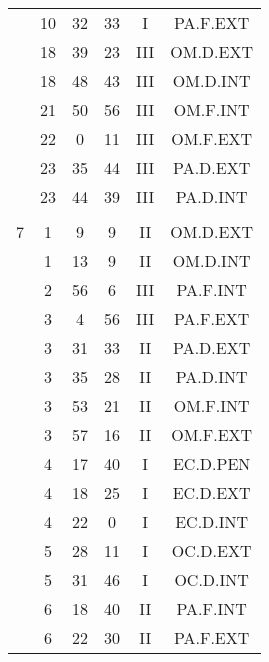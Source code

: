 \documentclass[12pt, a4paper]{article}
\begin{document}
\begin{multicols}{3}
{\begin{tabular}{c c c c c c}
	 	 	 	 & 10 & 32 & 33 & I & PA.F.EXT\\%
	 	 	 	 & 18 & 39 & 23 & III & OM.D.EXT\\%
	 	 	 	 & 18 & 48 & 43 & III & OM.D.INT\\%
	 	 	 	 & 21 & 50 & 56 & III & OM.F.INT\\%
	 	 	 	 & 22 & 0 & 11 & III & OM.F.EXT\\%
	 	 	 	 & 23 & 35 & 44 & III & PA.D.EXT\\%
	 	 	 	 & 23 & 44 & 39 & III & PA.D.INT\\%
	 	 	 	 & & & & & \\%
	 	 	 	7 & 1 & 9 & 9 & II & OM.D.EXT\\%
	 	 	 	 & 1 & 13 & 9 & II & OM.D.INT\\%
	 	 	 	 & 2 & 56 & 6 & III & PA.F.INT\\%
	 	 	 	 & 3 & 4 & 56 & III & PA.F.EXT\\%
	 	 	 	 & 3 & 31 & 33 & II & PA.D.EXT\\%
	 	 	 	 & 3 & 35 & 28 & II & PA.D.INT\\%
	 	 	 	 & 3 & 53 & 21 & II & OM.F.INT\\%
	 	 	 	 & 3 & 57 & 16 & II & OM.F.EXT\\%
	 	 	 	 & 4 & 17 & 40 & I & EC.D.PEN\\%
	 	 	 	 & 4 & 18 & 25 & I & EC.D.EXT\\%
	 	 	 	 & 4 & 22 & 0 & I & EC.D.INT\\%
	 	 	 	 & 5 & 28 & 11 & I & OC.D.EXT\\%
	 	 	 	 & 5 & 31 & 46 & I & OC.D.INT\\%
	 	 	 	 & 6 & 18 & 40 & II & PA.F.INT\\%
	 	 	 	 & 6 & 22 & 30 & II & PA.F.EXT\\%

\end{tabular}}
\end{multicols}
\end{document}
